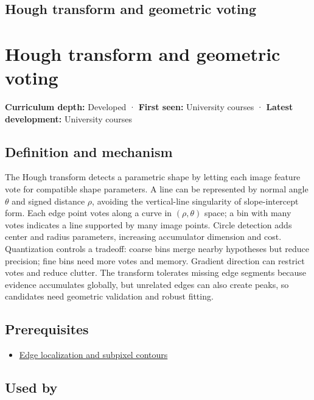 \hypertarget{appendix-a5b0383b3b3e}{}
\section*{Hough transform and geometric voting}
\chapter{Hough transform and geometric voting}\label{appendix-a5b0383b3b3e-hough-transform-and-geometric-voting}

\textbf{Curriculum depth:} Developed · \textbf{First seen:} University courses · \textbf{Latest development:} University courses

\section{Definition and mechanism}\label{appendix-a5b0383b3b3e-definition-and-mechanism}

The Hough transform detects a parametric shape by letting each image feature vote for compatible shape parameters. A line can be represented by normal angle \(\theta\) and signed distance \(\rho\), avoiding the vertical-line singularity of slope-intercept form. Each edge point votes along a curve in \((\rho,\theta)\) space; a bin with many votes indicates a line supported by many image points. Circle detection adds center and radius parameters, increasing accumulator dimension and cost. Quantization controls a tradeoff: coarse bins merge nearby hypotheses but reduce precision; fine bins need more votes and memory. Gradient direction can restrict votes and reduce clutter. The transform tolerates missing edge segments because evidence accumulates globally, but unrelated edges can also create peaks, so candidates need geometric validation and robust fitting.

\section{Prerequisites}\label{appendix-a5b0383b3b3e-prerequisites}

\begin{itemize}
\tightlist
\item
  \hyperref[appendix-36022286b03e]{Edge localization and subpixel contours}
\end{itemize}

\section{Used by}\label{appendix-a5b0383b3b3e-used-by}

